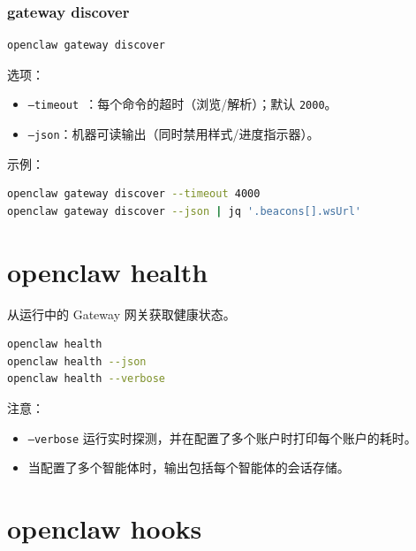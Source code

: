 \subsubsection{gateway discover}


\begin{lstlisting}[language=bash]
openclaw gateway discover
\end{lstlisting}


选项：

\begin{itemize}
  \item \texttt{--timeout }：每个命令的超时（浏览/解析）；默认 \texttt{2000}。
  \item \texttt{--json}：机器可读输出（同时禁用样式/进度指示器）。
\end{itemize}


示例：

\begin{lstlisting}[language=bash]
openclaw gateway discover --timeout 4000
openclaw gateway discover --json | jq '.beacons[].wsUrl'
\end{lstlisting}



\clearpage

\section{openclaw health}


从运行中的 Gateway 网关获取健康状态。

\begin{lstlisting}[language=bash]
openclaw health
openclaw health --json
openclaw health --verbose
\end{lstlisting}


注意：

\begin{itemize}
  \item \texttt{--verbose} 运行实时探测，并在配置了多个账户时打印每个账户的耗时。
  \item 当配置了多个智能体时，输出包括每个智能体的会话存储。
\end{itemize}



\clearpage

\section{openclaw hooks}


